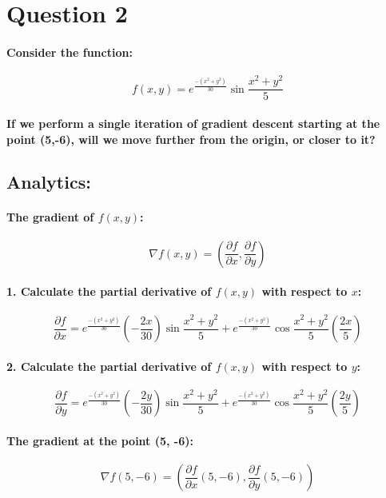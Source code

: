 \documentclass[11pt]{article} %
\begin{document}
\section{Question 2}
\paragraph{Consider the function: }
$$ f(x,y)=e^{\frac{-(x^2+y^2)}{30}} \sin \frac{x^2+y^2}{5} $$
\paragraph{If we perform a single iteration of gradient descent starting at the point (5,-6), will we move further from the origin, or closer to it?}
% 
\subsection{Analytics:}
% 
% 
% 
\paragraph{The gradient of \(f(x, y)\):}

$$
\nabla f(x, y) = \left(\frac{\partial f}{\partial x}, \frac{\partial f}{\partial y}\right)
$$

\paragraph{1. Calculate the partial derivative of \(f(x, y)\) with respect to \(x\):}
% 
$$ \frac{\partial f}{\partial x} = e^{\frac{-(x^2+y^2)}{30}}\left(-\frac{2x}{30}\right) \sin \frac{x^2+y^2}{5} + e^{\frac{-(x^2+y^2)}{30}} \cos \frac{x^2+y^2}{5} \left(\frac{2x}{5}\right) $$
% 
\paragraph{2. Calculate the partial derivative of \(f(x, y)\) with respect to \(y\):}
$$
\frac{\partial f}{\partial y} = e^{\frac{-(x^2+y^2)}{30}}\left(-\frac{2y}{30}\right) \sin \frac{x^2+y^2}{5} + e^{\frac{-(x^2+y^2)}{30}} \cos \frac{x^2+y^2}{5} \left(\frac{2y}{5}\right)
$$
% 
\paragraph{The gradient at the point (5, -6):}

$$
\nabla f(5, -6) = \left(\frac{\partial f}{\partial x}(5, -6), \frac{\partial f}{\partial y}(5, -6)\right)
$$
\end{document}
